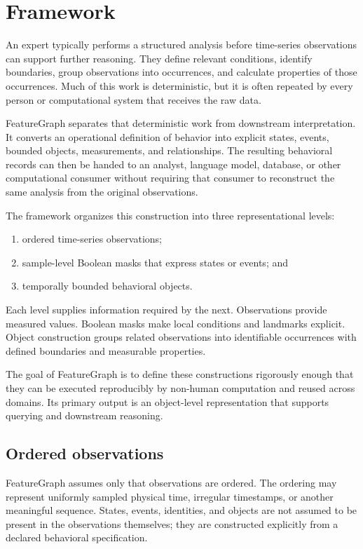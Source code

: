 \section{Framework}

An expert typically performs a structured analysis before time-series observations can support further reasoning. They define relevant conditions, identify boundaries, group observations into occurrences, and calculate properties of those occurrences. Much of this work is deterministic, but it is often repeated by every person or computational system that receives the raw data.

FeatureGraph separates that deterministic work from downstream interpretation. It converts an operational definition of behavior into explicit states, events, bounded objects, measurements, and relationships. The resulting behavioral records can then be handed to an analyst, language model, database, or other computational consumer without requiring that consumer to reconstruct the same analysis from the original observations.

The framework organizes this construction into three representational levels:

\begin{enumerate}
    \item ordered time-series observations;
    \item sample-level Boolean masks that express states or events; and
    \item temporally bounded behavioral objects.
\end{enumerate}

Each level supplies information required by the next. Observations provide measured values. Boolean masks make local conditions and landmarks explicit. Object construction groups related observations into identifiable occurrences with defined boundaries and measurable properties.

The goal of FeatureGraph is to define these constructions rigorously enough that they can be executed reproducibly by non-human computation and reused across domains. Its primary output is an object-level representation that supports querying and downstream reasoning.

\subsection{Ordered observations}

FeatureGraph assumes only that observations are ordered. The ordering may represent uniformly sampled physical time, irregular timestamps, or another meaningful sequence. States, events, identities, and objects are not assumed to be present in the observations themselves; they are constructed explicitly from a declared behavioral specification.

